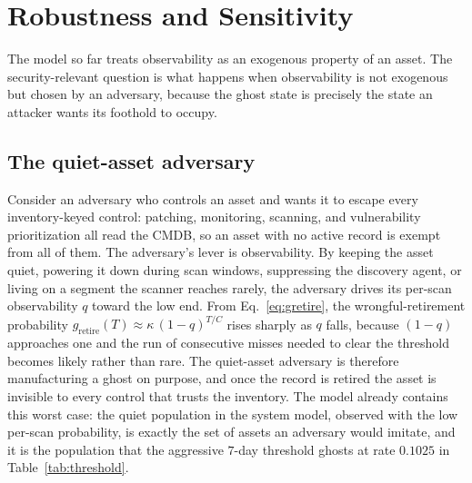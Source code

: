 \documentclass[journal]{IEEEtran}
\begin{document}
\section{Robustness and Sensitivity}
The model so far treats observability as an exogenous property of an asset. The security-relevant
question is what happens when observability is not exogenous but chosen by an adversary, because the
ghost state is precisely the state an attacker wants its foothold to occupy.

\subsection{The quiet-asset adversary}
Consider an adversary who controls an asset and wants it to escape every inventory-keyed control:
patching, monitoring, scanning, and vulnerability prioritization all read the CMDB, so an asset with
no active record is exempt from all of them. The adversary's lever is observability. By keeping the
asset quiet, powering it down during scan windows, suppressing the discovery agent, or living on a
segment the scanner reaches rarely, the adversary drives its per-scan observability $q$ toward the
low end. From Eq.~\eqref{eq:gretire}, the wrongful-retirement probability $g_{\text{retire}}(T)
\approx \kappa\,(1 - q)^{T/C}$ rises sharply as $q$ falls, because $(1 - q)$ approaches one and the
run of consecutive misses needed to clear the threshold becomes likely rather than rare. The
quiet-asset adversary is therefore manufacturing a ghost on purpose, and once the record is retired
the asset is invisible to every control that trusts the inventory. The model already contains this
worst case: the quiet population in the system model, observed with the low per-scan probability,
is exactly the set of assets an adversary would imitate, and it is the population that the aggressive
$7$-day threshold ghosts at rate $0.1025$ in Table~\ref{tab:threshold}.
\end{document}
